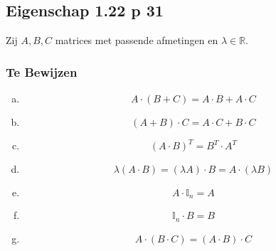 \documentclass[lineaire_algebra_oplossingen.tex]{subfiles}
\begin{document}
\subsection{Eigenschap 1.22 p 31}
\label{1.22}
Zij $A,B,C$ matrices met passende afmetingen en $\lambda \in \mathbb{R}$.

\subsubsection*{Te Bewijzen}
\begin{enumerate}[(a)]
\item \[ A\cdot (B+C) = A\cdot B + A \cdot C\]
\item \[ (A+B) \cdot C = A\cdot C + B \cdot C \]
\item \[ (A\cdot B)^T  = B^T \cdot A^T \]
\item \[ \lambda(A\cdot B) = (\lambda A)\cdot B = A \cdot (\lambda B)\]
\item \[ A \cdot \mathbb{I}_{n} = A \]
\item \[ \mathbb{I}_{n} \cdot B = B \]
\item \[ A\cdot (B\cdot C) = (A\cdot B) \cdot C\]
\end{enumerate}
\end{document}
